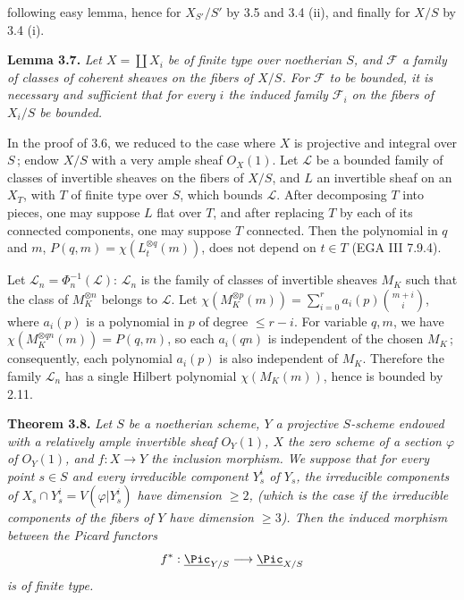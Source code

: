 %
following easy lemma, hence for \(X_{S'}/S'\) by 3.5 and 3.4 (ii), and finally for \(X/S\) by 3.4 (i).

\textbf{Lemma 3.7.} \emph{Let \(X=\coprod X_i\) be of finite type over noetherian \(S\), and \(\mathcal F\) a family of classes of coherent sheaves on the fibers of \(X/S\). For \(\mathcal F\) to be bounded, it is necessary and sufficient that for every \(i\) the induced family \(\mathcal F_i\) on the fibers of \(X_i/S\) be bounded.}

In the proof of 3.6, we reduced to the case where \(X\) is projective and integral over \(S\)\,; endow \(X/S\) with a very ample sheaf \({O}_X(1)\). Let \(\mathcal L\) be a bounded family of classes of invertible sheaves on the fibers of \(X/S\), and \(L\) an invertible sheaf on an \(X_T\), with \(T\) of finite type over \(S\), which bounds \(\mathcal L\). After decomposing \(T\) into pieces, one may suppose \(L\) flat over \(T\), and after replacing \(T\) by each of its connected components, one may suppose \(T\) connected. Then the polynomial in \(q\) and \(m\), \(P(q,m)=\chi(L_t^{\otimes q}(m))\), does not depend on \(t\in T\) (EGA III 7.9.4).

Let \(\mathcal L_n=\Phi_n^{-1}(\mathcal L)\): \(\mathcal L_n\) is the family of classes of invertible sheaves \(M_K\) such that the class of \(M_K^{\otimes n}\) belongs to \(\mathcal L\). Let \(\chi(M_K^{\otimes p}(m))=\sum_{i=0}^{r}a_i(p)\binom{m+i}{i}\), where \(a_i(p)\) is a polynomial in \(p\) of degree \(\le r-i\). For variable \(q,m\), we have \(\chi(M_K^{\otimes qn}(m))=P(q,m)\), so each \(a_i(qn)\) is independent of the chosen \(M_K\)\,; consequently, each polynomial \(a_i(p)\) is also independent of \(M_K\). Therefore the family \(\mathcal L_n\) has a single Hilbert polynomial \(\chi(M_K(m))\), hence is bounded by 2.11.

\textbf{Theorem 3.8.} \emph{Let \(S\) be a noetherian scheme, \(Y\) a projective \(S\)-scheme endowed with a relatively ample invertible sheaf \({O}_Y(1)\), \(X\) the zero scheme of a section \(\varphi\) of \({O}_Y(1)\), and \(f:X\to Y\) the inclusion morphism. We}
%
\emph{suppose that for every point \(s\in S\) and every irreducible component \(Y_s^i\) of \(Y_s\), the irreducible components of \(X_s\cap Y_s^i=V(\varphi|Y_s^i)\) have dimension \(\ge2\), (which is the case if the irreducible components of the fibers of \(Y\) have dimension \(\ge3\)). Then the induced morphism between the Picard functors}
\[
f^*:\underline{\Pic}_{Y/S}\longrightarrow\underline{\Pic}_{X/S}
\]
\emph{is of finite type.}

